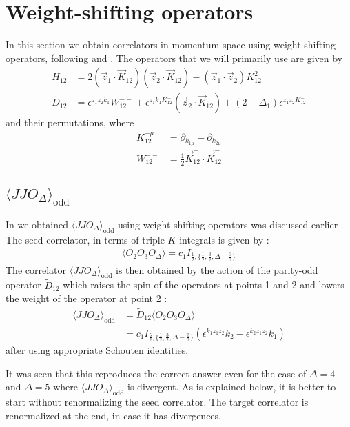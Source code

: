 \documentclass[a4paper,11pt]{article}
\begin{document}
%


\section{Weight-shifting operators}
\label{wso}
In this section we obtain correlators in momentum space using weight-shifting operators, following \cite{Baumann:2020dch} and \cite{Jain:2021wyn}. 
 The operators that we will primarily use are given by
\begin{align}
   H_{12}&=2\left(\vec{z}_{1} \cdot \vec{K}_{12}\right)\left(\vec{z}_{2} \cdot \vec{K}_{12}\right)-\left(\vec{z}_{1} \cdot \vec{z}_{2}\right) K_{12}^{2}\\[5 pt]
   \widetilde{D}_{12}&=\epsilon^{z_{1} z_{2} k_{1}} W_{12}^{--}+\epsilon^{z_{1} k_{1} K_{12}^{-}}\left(\vec{z}_{2} \cdot \vec{K}_{12}^{-}\right)+\left(2-\Delta_{1}\right) \epsilon^{z_{1} z_{2} K_{12}^{-}}
\end{align}
and their permutations, where
\begin{align}
   K_{12}^{-\mu} &=\partial_{k_{1\mu}}-\partial_{k_{2\mu}}\\[5 pt]
   W_{12}^{--} &= \frac{1}{2}\vec{K}_{12}^{-}\cdot \vec{K}_{12}^-
\end{align}
\subsection{$\langle JJO_{\Delta} \rangle_{\text{odd}}$}
In \cite{Jain:2021wyn} we obtained $\langle JJO_{\Delta} \rangle_{\text{odd}}$ using weight-shifting operators was discussed earlier . 
The seed correlator, in terms of triple-$K$ integrals is given by :
\begin{align}
    \langle O_2 O_3 O_{\Delta} \rangle = c_1I_{\frac{1}{2},\{\frac{1}{2},\frac{3}{2},\Delta-\frac{3}{2}\}}
\end{align}
The correlator $\langle JJO_{\Delta} \rangle_{\text{odd}}$ is then obtained by the action of the parity-odd operator $\widetilde{D}_{12}$ which raises the spin of the operators at points 1 and 2 and lowers the weight of the operator at point 2 :
\begin{align}
    \langle JJO_{\Delta} \rangle_{\text{odd}} &= \widetilde{D}_{12}\langle O_2 O_3 O_{\Delta} \rangle\nonumber \\[5 pt]
    &= c_1 I_{\frac{5}{2},\{\frac{1}{2},\frac{3}{2},\Delta-\frac{3}{2}\}}\left(\epsilon^{k_1 z_1 z_2}k_2-\epsilon^{k_2 z_1 z_2}k_1\right)
\end{align}
after using appropriate Schouten identities.
\par
It was seen that this reproduces the correct answer even for the case of $\Delta=4$ and $\Delta=5$ where $\langle JJO_{\Delta} \rangle_{\text{odd}}$ is divergent. As is explained below, it is better to start without renormalizing the seed correlator. The target correlator is renormalized at the end, in case it has divergences. 
\end{document}
